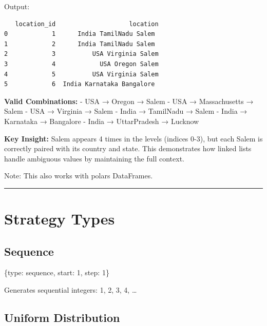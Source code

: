 \documentclass[
  letterpaper,
]{scrbook}
\newenvironment{Shaded}{\begin{snugshade}}{\end{snugshade}}
\newcommand{\DecValTok}[1]{\textcolor[rgb]{0.68,0.00,0.00}{#1}}
\newcommand{\NormalTok}[1]{\textcolor[rgb]{0.00,0.23,0.31}{#1}}
\newcommand{\StringTok}[1]{\textcolor[rgb]{0.13,0.47,0.30}{#1}}
\begin{document}
Output:

\begin{verbatim}
   location_id                    location
0            1      India TamilNadu Salem
1            2      India TamilNadu Salem
2            3          USA Virginia Salem
3            4            USA Oregon Salem
4            5          USA Virginia Salem
5            6  India Karnataka Bangalore
\end{verbatim}

\textbf{Valid Combinations:} - USA → Oregon → Salem - USA →
Massachusetts → Salem - USA → Virginia → Salem - India → TamilNadu →
Salem - India → Karnataka → Bangalore - India → UttarPradesh → Lucknow

\textbf{Key Insight:} Salem appears 4 times in the levels (indices 0-3),
but each Salem is correctly paired with its country and state. This
demonstrates how linked lists handle ambiguous values by maintaining the
full context.

Note: This also works with polars DataFrames.

\begin{center}\rule{0.5\linewidth}{0.5pt}\end{center}

\section{Strategy Types}\label{strategy-types}

\subsection{Sequence}\label{sequence}

\begin{Shaded}
\begin{Highlighting}[]
\NormalTok{\{}\StringTok{\textquotesingle{}type\textquotesingle{}}\NormalTok{: }\StringTok{\textquotesingle{}sequence\textquotesingle{}}\NormalTok{, }\StringTok{\textquotesingle{}start\textquotesingle{}}\NormalTok{: }\DecValTok{1}\NormalTok{, }\StringTok{\textquotesingle{}step\textquotesingle{}}\NormalTok{: }\DecValTok{1}\NormalTok{\}}
\end{Highlighting}
\end{Shaded}

Generates sequential integers: 1, 2, 3, 4, \ldots{}

\subsection{Uniform Distribution}\label{uniform-distribution}
\end{document}
